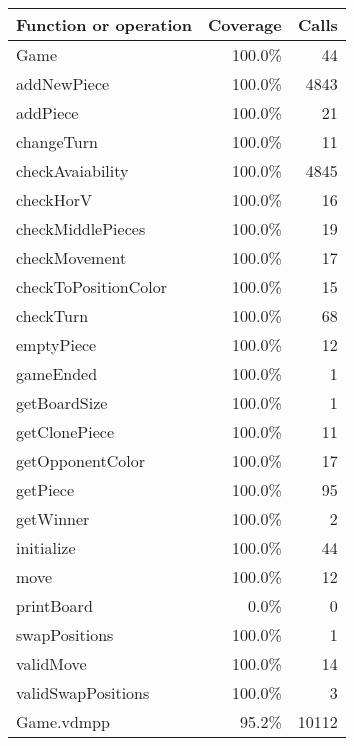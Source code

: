 \begin{longtable}{|l|r|r|}
\hline
Function or operation & Coverage & Calls \\
\hline
\hline
Game & 100.0\% & 44 \\
\hline
addNewPiece & 100.0\% & 4843 \\
\hline
addPiece & 100.0\% & 21 \\
\hline
changeTurn & 100.0\% & 11 \\
\hline
checkAvaiability & 100.0\% & 4845 \\
\hline
checkHorV & 100.0\% & 16 \\
\hline
checkMiddlePieces & 100.0\% & 19 \\
\hline
checkMovement & 100.0\% & 17 \\
\hline
checkToPositionColor & 100.0\% & 15 \\
\hline
checkTurn & 100.0\% & 68 \\
\hline
emptyPiece & 100.0\% & 12 \\
\hline
gameEnded & 100.0\% & 1 \\
\hline
getBoardSize & 100.0\% & 1 \\
\hline
getClonePiece & 100.0\% & 11 \\
\hline
getOpponentColor & 100.0\% & 17 \\
\hline
getPiece & 100.0\% & 95 \\
\hline
getWinner & 100.0\% & 2 \\
\hline
initialize & 100.0\% & 44 \\
\hline
move & 100.0\% & 12 \\
\hline
printBoard & 0.0\% & 0 \\
\hline
swapPositions & 100.0\% & 1 \\
\hline
validMove & 100.0\% & 14 \\
\hline
validSwapPositions & 100.0\% & 3 \\
\hline
\hline
Game.vdmpp & 95.2\% & 10112 \\
\hline
\end{longtable}

